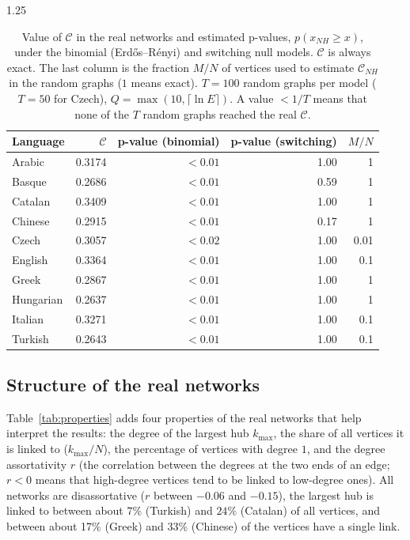 \documentclass[12pt]{article}
\newcommand{\metric}{\mathcal{C}}
\newcommand{\pval}{p(x_{NH} \geq x)}
\begin{document}
\begin{spacing}{1.25}
\begin{table}[H]
    \centering
    \begin{tabular}{lrrrr}
        \toprule
        Language & $\metric$ & p-value (binomial) & p-value (switching) & $M/N$ \\
        \midrule
        Arabic    & 0.3174 & $<0.01$ & 1.00 & 1 \\
        Basque    & 0.2686 & $<0.01$ & 0.59 & 1 \\
        Catalan   & 0.3409 & $<0.01$ & 1.00 & 1 \\
        Chinese   & 0.2915 & $<0.01$ & 0.17 & 1 \\
        Czech     & 0.3057 & $<0.02$ & 1.00 & 0.01 \\
        English   & 0.3364 & $<0.01$ & 1.00 & 0.1 \\
        Greek     & 0.2867 & $<0.01$ & 1.00 & 1 \\
        Hungarian & 0.2637 & $<0.01$ & 1.00 & 1 \\
        Italian   & 0.3271 & $<0.01$ & 1.00 & 0.1 \\
        Turkish   & 0.2643 & $<0.01$ & 1.00 & 0.1 \\
        \bottomrule
    \end{tabular}
    \caption{Value of $\metric$ in the real networks and estimated p-values, $\pval$, under the binomial (Erdős–Rényi) and switching null models. $\metric$ is always exact. The last column is the fraction $M/N$ of vertices used to estimate $\metric_{NH}$ in the random graphs ($1$ means exact). $T=100$ random graphs per model ($T=50$ for Czech), $Q=\max(10,\lceil\ln E\rceil)$. A value $<1/T$ means that none of the $T$ random graphs reached the real $\metric$.}
    \label{tab:pvalues}
\end{table}


\subsection{Structure of the real networks}
Table~\ref{tab:properties} adds four properties of the real networks that help interpret the results: the degree of the largest hub $k_{\max}$, the share of all vertices it is linked to ($k_{\max}/N$), the percentage of vertices with degree $1$, and the degree assortativity $r$ (the correlation between the degrees at the two ends of an edge; $r<0$ means that high-degree vertices tend to be linked to low-degree ones). All networks are disassortative ($r$ between $-0.06$ and $-0.15$), the largest hub is linked to between about $7\%$ (Turkish) and $24\%$ (Catalan) of all vertices, and between about 17\% (Greek) and 33\% (Chinese) of the vertices have a single link.


\end{spacing}
\end{document}
